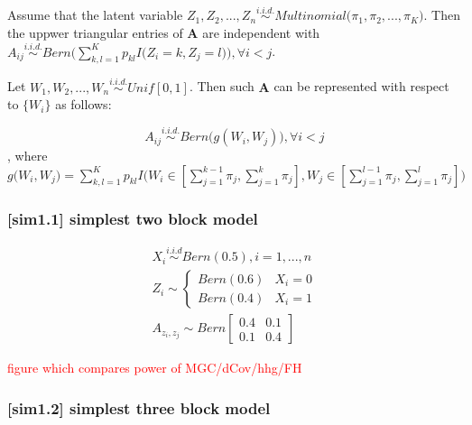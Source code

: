 \documentclass[12pt]{article}
\theoremstyle{definition}
\begin{document}
 Assume that the latent variable $Z_{1}, Z_{2}, ... , Z_{n} \overset{i.i.d.}{\sim} Multinomial\big( \pi_{1}, \pi_{2}, ... , \pi_{K} \big)$. Then the uppwer triangular entries of $\mathbf{A}$ are independent with 
 $A_{ij} \overset{i.i.d.}{\sim} Bern\big( \sum\limits_{k,l=1}^{K} p_{kl} I\big( Z_{i} = k, Z_{j} = l  \big)    \big), \forall  i < j$.
 
 Let $W_{1}, W_{2}, ... , W_{n} \overset{i.i.d.}{\sim} Unif[0,1]$. Then such $\mathbf{A}$ can be represented with respect to $\{ W_{i} \}$ as follows:

\begin{equation} 
A_{ij} \overset{i.i.d.}{\sim} Bern \big( g(W_{i}, W_{j})  \big), \forall i < j
\end{equation}
 , where $g\big( W_{i}, W_{j} \big) = \sum\limits_{k,l=1}^{K} p_{kl} I \big( W_{i} \in [\sum\limits_{j=1}^{k-1} \pi_{j}, \sum\limits_{j=1}^{k} \pi_{j}   ] , W_{j} \in [\sum\limits_{j=1}^{l-1} \pi_{j}, \sum\limits_{j=1}^{l} \pi_{j}  ]  \big)$


\subsubsection{[sim1.1] simplest two block model}

\begin{equation}
\begin{gathered}
X_{i} \overset{i.i.d}{\sim} Bern(0.5), i = 1,... , n \\ 
Z_{i}  \sim  \left\{  \begin{array}{cc} Bern(0.6) & X_{i} = 0 \\ Bern(0.4) & X_{i} = 1  \end{array} \right. \\
A_{z_{i}, z_{j}} \sim Bern \left[  \begin{array}{cc}   0.4 & 0.1  \\ 0.1 & 0.4 \end{array}  \right]
\end{gathered}
\end{equation}


\textcolor{red}{figure which compares power of MGC/dCov/hhg/FH}



\subsubsection{[sim1.2] simplest three block model}
\end{document}
